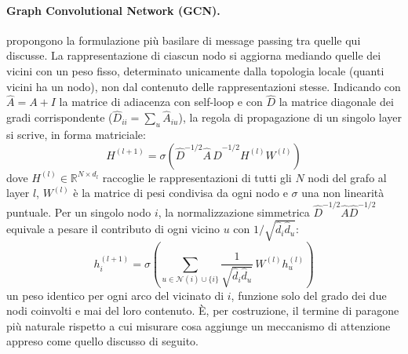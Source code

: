 \paragraph{Graph Convolutional Network (GCN).} \citet{kipf2017gcn}
propongono la formulazione più basilare di message passing tra quelle qui
discusse. La rappresentazione di ciascun nodo si aggiorna mediando quelle
dei vicini con un peso fisso, determinato unicamente dalla topologia
locale (quanti vicini ha un nodo), non dal contenuto delle
rappresentazioni stesse. Indicando con $\hat A = A + I$ la matrice di
adiacenza con self-loop e con $\hat D$ la matrice diagonale dei gradi
corrispondente ($\hat D_{ii} = \sum_u \hat A_{iu}$), la regola di
propagazione di un singolo layer si scrive, in forma matriciale:
\begin{equation}
  H^{(l+1)} = \sigma\!\left(\hat D^{-1/2} \hat A\, \hat D^{-1/2} H^{(l)} W^{(l)}\right)
  \label{eq:gcn-propagation}
\end{equation}
dove $H^{(l)} \in \mathbb{R}^{N \times d_l}$ raccoglie le rappresentazioni
di tutti gli $N$ nodi del grafo al layer $l$, $W^{(l)}$ è la matrice di
pesi condivisa da ogni nodo e $\sigma$ una non linearità puntuale. Per un
singolo nodo $i$, la normalizzazione simmetrica $\hat D^{-1/2}\hat
  A\hat D^{-1/2}$ equivale a pesare il contributo di ogni vicino $u$ con
$1/\sqrt{\hat d_i \hat d_u}$:
\begin{equation}
  h_i^{(l+1)} = \sigma\!\left(\sum_{u \in \mathcal{N}(i) \cup \{i\}}
  \frac{1}{\sqrt{\hat d_i \hat d_u}}\, W^{(l)} h_u^{(l)}\right)
  \label{eq:gcn-aggregate}
\end{equation}
un peso identico per ogni arco del vicinato di $i$, funzione solo del
grado dei due nodi coinvolti e mai del loro contenuto. È, per costruzione,
il termine di paragone più naturale rispetto a cui misurare cosa aggiunge
un meccanismo di attenzione appreso come quello discusso di seguito.

